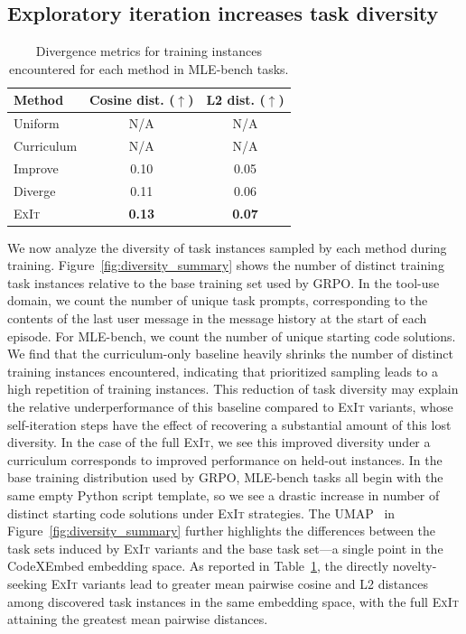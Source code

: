 \documentclass[10pt]{article} %
\newcommand{\methodname}{\textsc{ExIt}}
\begin{document}
\subsection{Exploratory iteration increases task diversity}

\begin{table}
\vspace{-0.4cm}
\small
  \centering
  \begin{tabular}{lcc}
    \toprule
    Method & Cosine dist. ($\uparrow$) & L2 dist. ($\uparrow$) \\
    \midrule
    Uniform       & N/A & N/A \\
    Curriculum    & N/A & N/A \\
    Improve       & 0.10 & 0.05 \\
    Diverge       & 0.11 & 0.06 \\
    \methodname{} & \textbf{0.13} & \textbf{0.07} \\
    \bottomrule
  \end{tabular}
  \caption{Divergence metrics for training instances encountered for each method in MLE-bench tasks.}
  \label{tab:mlebench_divergence_measures}
    \vspace{-0.4cm}
\end{table}

We now analyze the diversity of task instances sampled by each method during training. Figure~\ref{fig:diversity_summary} shows the number of distinct training task instances relative to the base training set used by GRPO. In the tool-use domain, we count the number of unique task prompts, corresponding to the contents of the last user message in the message history at the start of each episode. For MLE-bench, we count the number of unique starting code solutions. We find that the curriculum-only baseline heavily shrinks the number of distinct training instances encountered, indicating that prioritized sampling leads to a high repetition of training instances. This reduction of task diversity may explain the relative underperformance of this baseline compared to \methodname{} variants, whose self-iteration steps have the effect of recovering a substantial amount of this lost diversity. In the case of the full \methodname{}, we see this improved diversity under a curriculum corresponds to improved performance on held-out instances. In the base training distribution used by GRPO, MLE-bench tasks all begin with the same empty Python script template, so we see a drastic increase in number of distinct starting code solutions under \methodname{} strategies. The UMAP~\citep{mcinnes2018umap} in Figure~\ref{fig:diversity_summary} further highlights the differences between the task sets induced by \methodname{} variants and the base task set—a single point in the CodeXEmbed embedding space. 
As reported in Table~\ref{tab:mlebench_divergence_measures}, the directly novelty-seeking \methodname{} variants lead to greater mean pairwise cosine and L2 distances among discovered task instances in the same embedding space, with the full \methodname{} attaining the greatest mean pairwise distances.
\end{document}
